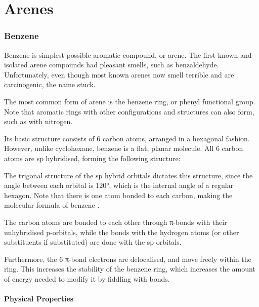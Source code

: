 

\pagebreak
\part{Arenes}
\hypertarget{ChapterArenes}{}

	\section{Benzene}

		Benzene is simplest possible aromatic compound, or arene. The first known and isolated arene compounds had pleasant smells,
		such as benzaldehyde. Unfortunately, even though most known arenes now smell terrible and are carcinogenic, the name stuck.


		The most common form of arene is the benzene ring, or phenyl functional group. Note that aromatic rings with other configurations
		and structures can also form, such as with nitrogen.

		Its basic structure consists of 6 carbon atoms, arranged in a hexagonal fashion. However, unlike cyclohexane, benzene is a flat,
		planar molecule. All 6 carbon atoms are sp hybridised, forming the following structure:


		The trigonal structure of the sp hybrid orbitals dictates this structure, since the angle between each orbital is \ang{120},
		which is the internal angle of a regular hexagon. Note that there is one  atom bonded to each carbon, making the molecular
		formula of benzene .

		The carbon atoms are bonded to each other through π-bonds with their unhybridised p-orbitals, while the bonds with the hydrogen
		atoms (or other substituents if substituted) are done with the sp orbitals.

		Furthermore, the 6 π-bond electrons are delocalised, and move freely within the ring. This increases the stability of the benzene
		ring, which increases the amount of energy needed to modify it by fiddling with bonds.


		\subsection{Physical Properties}

